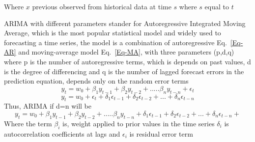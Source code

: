 \documentclass[graybox]{svmult}
\begin{document}
Where \(x\) previous observed from historical data at time \(s\) where \(s\) equal to \(t\)

ARIMA with different parameters 
stander for Autoregressive Integrated Moving Average, which is the most popular statistical model and widely used to forecasting a time series, the model is a combination of  autoregressive Eq.~\ref{Eq-AR} and moving-average model Eq.~\ref{Eq-MA}, with three parameters  (p,d,q) where p is the number of autoregressive terms, which is depends on past values, d is the degree of differencing and q is the number of lagged forecast errors in the prediction equation, depends only on the random error terms 
\begin{equation}
 y_t = w_0 +\beta_1 y_{t-1}+ \beta_2 y_{t-2}+.....\beta_n y_{t-n}+\epsilon_t
\label{Eq-AR}
\end{equation}
\begin{equation}
 y_t = w_0 +\epsilon_t + \delta_1 \epsilon_{t-1}+  \delta_2 \epsilon_{t-2}+...+ \delta_n \epsilon_{t-n}
\label{Eq-MA}
\end{equation}
Thus, ARIMA if d=n will be 
\begin{equation}
 y_t = w_0 +\beta_1 y_{t-1}+ \beta_2 y_{t-2}+.....\beta_n y_{t-n} +  \delta_1 \epsilon_{t-1}+  \delta_2 \epsilon_{t-2}+...+ \delta_n \epsilon_{t-n}+
\label{Eq-ARIMA}
\end{equation}
Where the term \(\beta_i \) is, weight applied to prior values in the time series \(\delta_i \) is autocorrelation coefficients at lags and \(\epsilon_i \) is residual error term 
\end{document}
